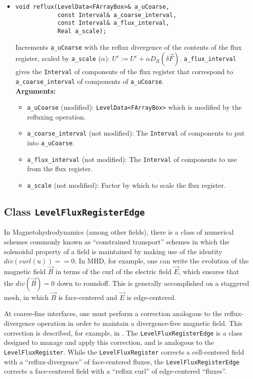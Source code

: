 \begin{itemize}
\item
\begin{verbatim}
void reflux(LevelData<FArrayBox>& a_uCoarse,
            const Interval& a_coarse_interval,
            const Interval& a_flux_interval,
            Real a_scale);
\end{verbatim}
Increments \verb/a_uCoarse/ with the reflux divergence of the contents of
the flux register, scaled by \verb/a_scale/ ($\alpha$):
$U^c := U^c + \alpha D_R(\delta \vec{F})$. 
\verb/a_flux_interval/ gives the \verb/Interval/ of components of
the flux register that correspond to \verb/a_coarse_interval/ of components
of \verb/a_uCoarse/.
\\ {\bf Arguments:} 
  \begin{itemize}
  \item
  \verb/a_uCoarse/ (modified):
  \verb/LevelData<FArrayBox>/ which is modified by the refluxing operation.
  \item
  \verb/a_coarse_interval/ (not modified):
  The \verb/Interval/ of components to put into \verb/a_uCoarse/.
  \item
  \verb/a_flux_interval/ (not modified):
  The \verb/Interval/ of components to use from the flux register.
  \item
  \verb/a_scale/ (not modified):
  Factor by which to scale the flux register.
  \end{itemize}

\end{itemize}


\subsection{Class {\tt LevelFluxRegisterEdge}}
In Magnetohydrodynamics (among other fields), there is a class of
numerical schemes commonly known as ``constrained transport'' schemes
in which the solenoidal property of a field is maintained by making use of the
identity $div(curl(u) ) == 0$. In MHD, for example, one can write the
evolution of the magnetic field $\vec{B}$ in terms of the curl of the
electric field $\vec{E}$, which ensures that the $div(\vec{B}) = 0$
down to roundoff. This is generally accomplished on a staggered mesh,
in which $\vec{B}$ is face-centered and $\vec{E}$ is edge-centered.

At coarse-fine interfaces, one must perform a correction analogous to
the reflux-divergence operation in order to maintain a divergence-free
magnetic field. This correction is described, for example, in
\cite{Balsara:2001}. The {\tt LevelFluxRegisterEdge} is a class
designed to manage and apply this correction, and is analogous to the
{\tt LevelFluxRegister}. While the {\tt LevelFluxRegister} corrects a
cell-centered field with a ``reflux-divergence'' of face-centered
fluxes, the {\tt LevelFluxRegisterEdge} corrects a face-centered field
with a ``reflux curl'' of edge-centered ``fluxes''. 

